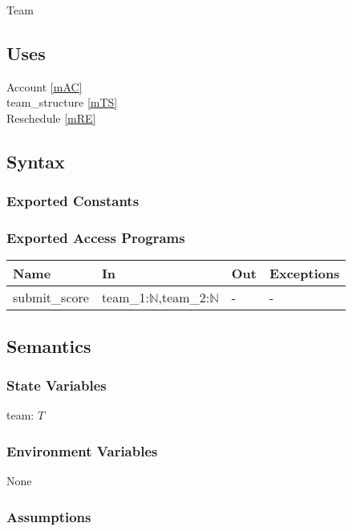 \documentclass[12pt, titlepage]{article}
\begin{document}
Team

\subsection{Uses}

Account \ref{mAC} \\
team\_structure \ref{mTS} \\
Reschedule \ref{mRE}

\subsection{Syntax}

\subsubsection{Exported Constants}

\subsubsection{Exported Access Programs}

\begin{center}
\begin{tabular}{p{3cm} p{7cm} p{2cm} p{2cm}}
\hline
\textbf{Name} & \textbf{In} & \textbf{Out} & \textbf{Exceptions} \\
\hline
submit\_score & team\_1:$\mathbb{N}$,team\_2:$\mathbb{N}$ & - & - \\
\hline
\end{tabular}
\end{center}

\subsection{Semantics}

\subsubsection{State Variables}

team: $T$

\subsubsection{Environment Variables}

None

\subsubsection{Assumptions}
\end{document}
